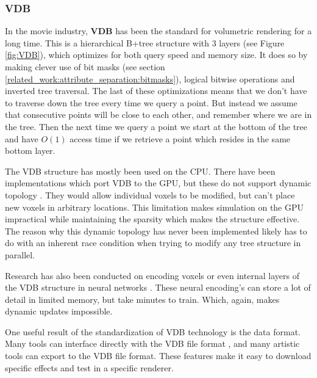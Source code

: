 \subsubsection{VDB} \label{related_work:voxel_data_structures:vdb}
In the movie industry, \textbf{VDB} \cite{museth2013vdb} has been the standard for volumetric rendering for a long time. This is a hierarchical B+tree structure with 3 layers (see Figure \ref{fig:VDB}), which optimizes for both query speed and memory size. It does so by making clever use of bit masks (see section \ref{related_work:attribute_separation:bitmasks}), logical bitwise operations and inverted tree traversal. The last of these optimizations means that we don't have to traverse down the tree every time we query a point. But instead we assume that consecutive points will be close to each other, and remember where we are in the tree. Then the next time we query a point we start at the bottom of the tree and have $O(1)$ access time if we retrieve a point which resides in the same bottom layer.

The VDB structure has mostly been used on the CPU. There have been implementations which port VDB to the GPU, but these do not support dynamic topology \cite{hoetzlein2016gvdb} \cite{museth2021nanovdb}. They would allow individual voxels to be modified, but can't place new voxels in arbitrary locations. This limitation makes simulation on the GPU impractical while maintaining the sparsity which makes the structure effective. The reason why this dynamic topology has never been implemented likely has to do with an inherent race condition when trying to modify any tree structure in parallel.

Research has also been conducted on encoding voxels or even internal layers of the VDB structure in neural networks \cite{kim2022neuralvdb}. These neural encoding's can store a lot of detail in limited memory, but take minutes to train. Which, again, makes dynamic updates impossible.

One useful result of the standardization of VDB technology is the data format. Many tools can interface directly with the VDB file format \cite{VDBADeepDive}, and many artistic tools can export to the VDB file format. These features make it easy to download specific effects and test in a specific renderer.

